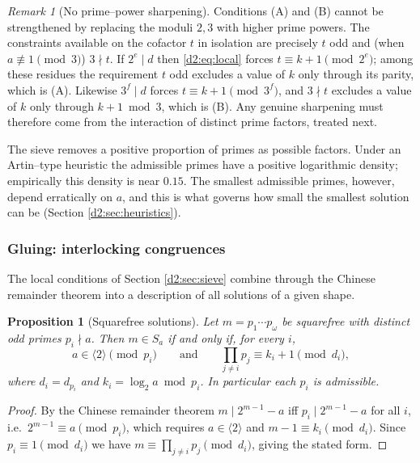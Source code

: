\documentclass[a4paper]{article}
\theoremstyle{plain}
\newtheorem{proposition}{Proposition}[subsection]
\theoremstyle{definition}
\theoremstyle{remark}
\newtheorem{remark}{Remark}[subsection]
\newcommand{\dvd}{\mid}
\newcommand{\Sa}{S_a}
\begin{document}
\begin{remark}[No prime--power sharpening]\label{d2:rem:nosharpen}
Conditions (A) and (B) cannot be strengthened by replacing the moduli $2,3$ with higher prime powers. The constraints available on the cofactor $t$ in isolation are precisely $t$ odd and (when $a\not\equiv1\pmod3$) $3\nmid t$. If $2^{e}\dvd d$ then \eqref{d2:eq:local} forces $t\equiv k+1\pmod{2^{e}}$; among these residues the requirement $t$ odd excludes a value of $k$ only through its parity, which is (A). Likewise $3^{f}\dvd d$ forces $t\equiv k+1\pmod{3^{f}}$, and $3\nmid t$ excludes a value of $k$ only through $k+1\bmod3$, which is (B). Any genuine sharpening must therefore come from the interaction of distinct prime factors, treated next.
\end{remark}

The sieve removes a positive proportion of primes as possible factors. Under an Artin--type heuristic \cite{d2:hooley} the admissible primes have a positive logarithmic density; empirically this density is near $0.15$. The smallest admissible primes, however, depend erratically on $a$, and this is what governs how small the smallest solution can be (Section \ref{d2:sec:heuristics}).

\subsubsection{Gluing: interlocking congruences}\label{d2:sec:gluing}

The local conditions of Section \ref{d2:sec:sieve} combine through the Chinese remainder theorem into a description of all solutions of a given shape.

\begin{proposition}[Squarefree solutions]\label{d2:prop:squarefree}
Let $m=p_1\cdots p_\omega$ be squarefree with distinct odd primes $p_i\nmid a$. Then $m\in\Sa$ if and only if, for every $i$,
\[
a\in\langle2\rangle\pmod{p_i}\qquad\text{and}\qquad \prod_{j\ne i}p_j\equiv k_i+1\pmod{d_i},
\]
where $d_i=d_{p_i}$ and $k_i=\log_2a\bmod p_i$. In particular each $p_i$ is admissible.
\end{proposition}

\begin{proof}
By the Chinese remainder theorem $m\dvd2^{m-1}-a$ iff $p_i\dvd2^{m-1}-a$ for all $i$, i.e.\ $2^{m-1}\equiv a\pmod{p_i}$, which requires $a\in\langle2\rangle$ and $m-1\equiv k_i\pmod{d_i}$. Since $p_i\equiv1\pmod{d_i}$ we have $m\equiv\prod_{j\ne i}p_j\pmod{d_i}$, giving the stated form.
\end{proof}
\end{document}
